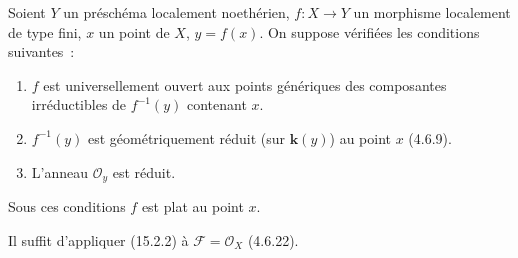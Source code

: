 \begin{corollary}[15.2.3]
\label{IV.15.2.3-fr}
Soient $Y$ un préschéma localement noethérien, $f:X\to Y$ un morphisme localement
de type fini, $x$ un point de $X$, $y=f(x)$. On suppose vérifiées les conditions
suivantes~:
\begin{enumerate}[label=(\roman*)]
  \item $f$ est universellement ouvert aux points génériques des composantes
  irréductibles de $f^{-1}(y)$ contenant $x$.
  \item $f^{-1}(y)$ est géométriquement réduit (sur $\mathbf{k}(y)$) au point
  $x$ (4.6.9).
  \item L'anneau $\mathcal O_y$ est réduit.
\end{enumerate}
Sous ces conditions $f$ est plat au point $x$.
\end{corollary}

Il suffit d'appliquer (15.2.2) à $\mathcal F=\mathcal O_X$ (4.6.22).

